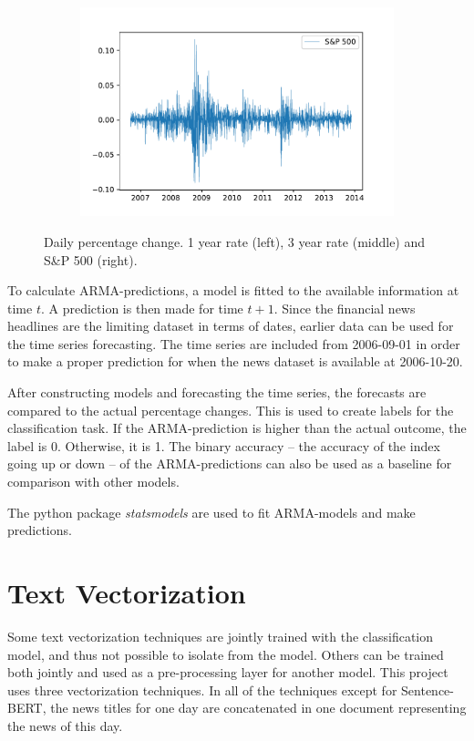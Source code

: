 \begin{figure}[H]
\begin{subfigure}[b]{0.32\textwidth}
    \includegraphics[width=\textwidth]{Figures/sp_pct.pdf}
    \end{subfigure}
    \caption{Daily percentage change. 1 year rate (left), 3 year rate (middle) and S\&P 500 (right).}
    \label{fig:pct_ts}
\end{figure}

To calculate ARMA-predictions, a model is fitted to the available information at time $t$. A prediction is then made for time $t+1$. Since the financial news headlines are the limiting dataset in terms of dates, earlier data can be used for the time series forecasting. The time series are included from 2006-09-01 in order to make a proper prediction for when the news dataset is available at 2006-10-20. 

After constructing models and forecasting the time series, the forecasts are compared to the actual percentage changes. This is used to create labels for the classification task. If the ARMA-prediction is higher than the actual outcome, the label is 0. Otherwise, it is 1. 
The binary accuracy -- the accuracy of the index going up or down -- of the ARMA-predictions can also be used as a baseline for comparison with other models. 

The python package \emph{statsmodels} are used to fit ARMA-models and make predictions. 

\section{Text Vectorization}
Some text vectorization techniques are jointly trained with the classification model, and thus not possible to isolate from the model. Others can be trained both jointly and used as a pre-processing layer for another model. This project uses three vectorization techniques. In all of the techniques except for Sentence-BERT, the news titles for one day are concatenated in one document representing the news of this day. 

